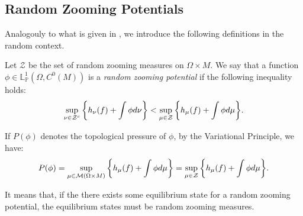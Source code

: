 \documentclass[12pt,a4paper]{amsart}
\theoremstyle{plain}
\begin{document}
	
	
	\subsection{Random Zooming Potentials}
	
	Analogouly to what is given in \cite{PV}, we introduce the following definitions in the random context.
	
	Let $\mathcal{Z}$ be the set of random zooming measures on $\Omega \times M$. We say that a function $\phi  \in \mathbb{L}^{1}_{\mathbb{P}}(\Omega,C^0(M))$ is a \emph{random zooming potential} if the following inequality holds:
	\begin{equation}
		\label{equaexpandpoten1}
		\displaystyle \sup_{\nu \in \mathcal{Z}^{c}}\bigg{\{} h_{\nu}(f) + \int \phi d\nu \bigg{\}} < \sup_{\mu \in \mathcal{Z}}\bigg{\{} h_{\mu}(f) + \int \phi d\mu \bigg{\}}. 
	\end{equation}
	
	If $P(\phi)$ denotes the topological pressure of $\phi$, by the Variational Principle, we have:
	\[
	P(\phi) = \sup_{\mu \in \mathcal{M}(\Omega \times M)}\bigg{\{} h_{\mu}(f) + \int \phi d\mu \bigg{\}} = \sup_{\mu \in \mathcal{Z}}\bigg{\{} h_{\mu}(f) + \int \phi d\mu \bigg{\}}. 
	\]
	
	It means that, if the there exists some equilibrium state for a random zooming potential, the equilibrium states must be random zooming measures.
	
	
	
	
\end{document}
